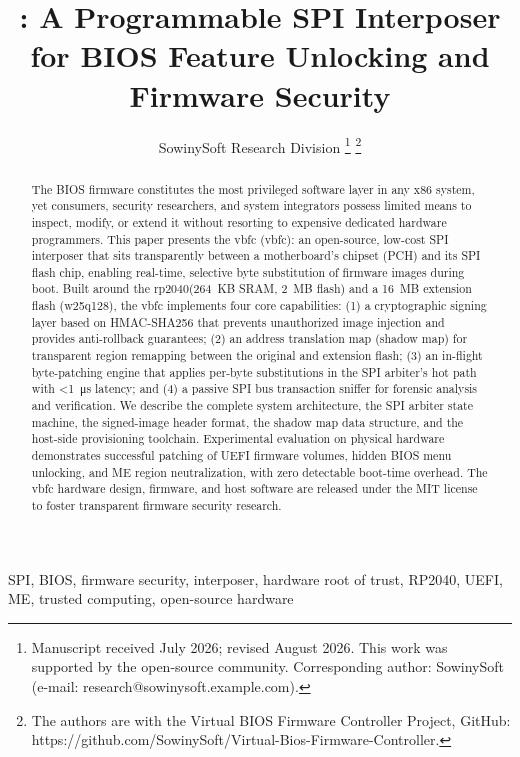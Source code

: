 \documentclass[10pt,journal,compsoc]{IEEEtran}
\title{
  \vbfc: A Programmable \ac{SPI} Interposer for \ac{BIOS} Feature Unlocking and Firmware Security
}
\author{
  SowinySoft Research Division%
  \thanks{Manuscript received July 2026; revised August 2026. This work was supported by the open-source community. Corresponding author: SowinySoft (e-mail: research@sowinysoft.example.com).}%
  \thanks{The authors are with the Virtual BIOS Firmware Controller Project, GitHub: https://github.com/SowinySoft/Virtual-Bios-Firmware-Controller.}%
}
\newcommand{\vbfc}{\gls{vbfc}\xspace}
\newcommand{\rp}{\gls{rp2040}\xspace}
\newcommand{\wq}{\gls{w25q128}\xspace}
\begin{document}
\maketitle

\begin{abstract}
The \ac{BIOS} firmware constitutes the most privileged software layer in any x86 system, yet consumers, security researchers, and system integrators possess limited means to inspect, modify, or extend it without resorting to expensive dedicated hardware programmers. This paper presents the \acf{vbfc} (\vbfc): an open-source, low-cost \ac{SPI} interposer that sits transparently between a motherboard's chipset (\ac{PCH}) and its \ac{SPI} flash chip, enabling real-time, selective byte substitution of firmware images during boot. Built around the \rp (\SI{264}{KB} \ac{SRAM}, \SI{2}{MB} flash) and a \SI{16}{MB} extension flash (\wq), the \vbfc implements four core capabilities: (1) a cryptographic signing layer based on \ac{HMAC}-\ac{SHA}256 that prevents unauthorized image injection and provides anti-rollback guarantees; (2) an address translation map (shadow map) for transparent region remapping between the original and extension flash; (3) an in-flight byte-patching engine that applies per-byte substitutions in the \ac{SPI} arbiter's hot path with \SI{<1}{\micro s} latency; and (4) a passive \ac{SPI} bus transaction sniffer for forensic analysis and verification. We describe the complete system architecture, the \ac{SPI} arbiter state machine, the signed-image header format, the shadow map data structure, and the host-side provisioning toolchain. Experimental evaluation on physical hardware demonstrates successful patching of \ac{UEFI} firmware volumes, hidden \ac{BIOS} menu unlocking, and \ac{ME} region neutralization, with zero detectable boot-time overhead. The \vbfc hardware design, firmware, and host software are released under the MIT license to foster transparent firmware security research.
\end{abstract}

\begin{IEEEkeywords}
\ac{SPI}, \ac{BIOS}, firmware security, interposer, hardware root of trust, \ac{RP2040}, \ac{UEFI}, \ac{ME}, trusted computing, open-source hardware
\end{IEEEkeywords}












\printbibliography[heading=bibintoc,title={References}]

\appendix




\end{document}
